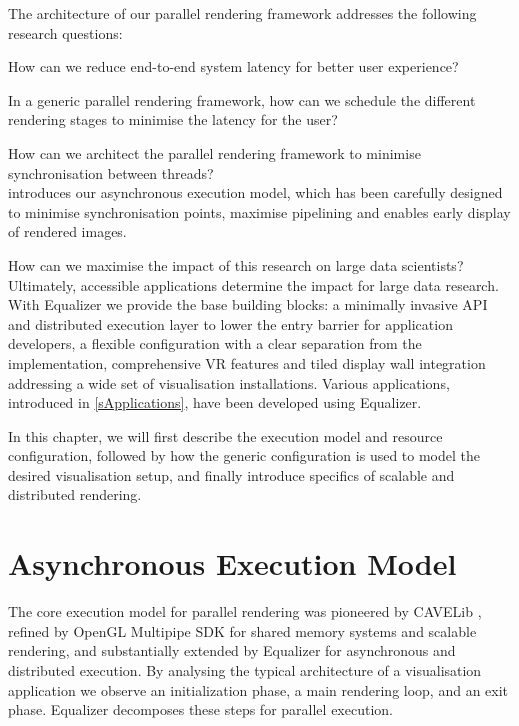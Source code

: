 The architecture of our parallel rendering framework addresses the following research questions:
\begin{compactitem}
  \item How can we reduce end-to-end system latency for better user experience?
  \item In a generic parallel rendering framework, how can we schedule the different rendering stages to minimise the latency for the user?
  \item How can we architect the parallel rendering framework to minimise synchronisation between threads?\\[\smallskipamount]

 introduces our asynchronous execution model, which has been
carefully designed to minimise synchronisation points, maximise pipelining and
enables early display of rendered images.\\[\smallskipamount]

\item How can we maximise the impact of this research on large data
scientists?\\[\smallskipamount]

Ultimately, accessible applications determine the impact for large data
research. With Equalizer we provide the base building blocks: a minimally
invasive API and distributed execution layer to lower the entry barrier for
application developers, a flexible configuration with a clear separation from
the implementation, comprehensive VR features and tiled display wall
integration addressing a wide set of visualisation installations. Various
applications, introduced in \cref{sApplications}, have been developed using
Equalizer.

\end{compactitem}

In this chapter, we will first describe the execution model and resource
configuration, followed by how the generic configuration is used to model
the desired visualisation setup, and finally introduce specifics of scalable
and distributed rendering.

\section{Asynchronous Execution Model}\label{sAsyncExec}

The core execution model for parallel rendering was pioneered by CAVELib
\cite{DACNCCGHPSNS:97}, refined by OpenGL Multipipe SDK for shared memory
systems and scalable rendering, and substantially extended by Equalizer for
asynchronous and distributed execution. By analysing the typical architecture of
a visualisation application we observe an initialization phase, a main rendering
loop, and an exit phase. Equalizer decomposes these steps for parallel
execution.

